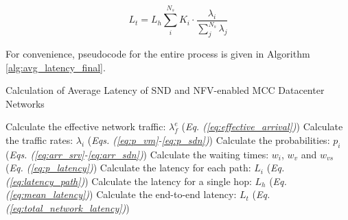 \begin{equation}
    \label{eq:total_network_latency}
    L_t = L_h \sum_i^{N_s} K_i \cdot \frac{\lambda_i}{\sum_j^{N_s} \lambda_j}
\end{equation}

For convenience, pseudocode for the entire process is given in Algorithm \ref{alg:avg_latency_final}.

\begin{algorithm}

    \caption{Calculation of Average Latency of SND and NFV-enabled MCC Datacenter Networks}
    \label{alg:avg_latency_final}

    \begin{algorithmic}[1]
        \STATE Calculate the effective network traffic: $\lambda_f^e$ \hfill(\textit{Eq. (\ref{eq:effective_arrival})})
        \STATE Calculate the traffic rates: $\lambda_i$ \hfill(\textit{Eqs. (\ref{eq:p_vm}-\ref{eq:p_sdn})})
        \STATE Calculate the probabilities: $p_i$ \hfill(\textit{Eqs. (\ref{eq:arr_srv}-\ref{eq:arr_sdn})})
        \STATE Calculate the waiting times: $w_i$, $w_v$ and $w_{vs}$ \hfill(\textit{Eq. (\ref{eq:p_latency})})
        \STATE Calculate the latency for each path: $L_i$ \hfill (\textit{Eq. (\ref{eq:latency_path})})
        \STATE Calculate the latency for a single hop: $L_h$ \hfill (\textit{Eq. (\ref{eq:mean_latency})})
        \STATE Calculate the end-to-end latency: $L_t$ \hfill (\textit{Eq. (\ref{eq:total_network_latency})})
    \end{algorithmic}
\end{algorithm}